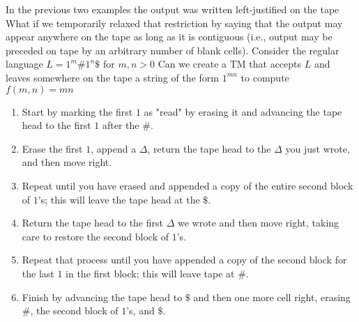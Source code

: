 \documentclass{report}
\begin{document}
\begin{itemize}
            \bigbreak \noindent 
            In the previous two examples the output was written left-justified on the tape
            \bigbreak \noindent 
            What if we temporarily relaxed that restriction by saying that the output may appear anywhere on the tape as long as it is contiguous (i.e., output may be preceded on tape by an arbitrary number of blank cells).
            \bigbreak \noindent 
            Consider the regular language $L = 1^{m}\#1^{n}\$$ for $m,n > 0$
            \bigbreak \noindent 
            Can we create a TM that accepts $L$ and leaves somewhere on the tape a string of the form $1^{mn}$ to compute $f(m,n) = mn$
            \begin{enumerate}
                \item Start by marking the first \(1\) as "read" by erasing it and advancing the tape head to the first \(1\) after the \#.
                \item Erase the first \(1\), append a \(\Delta\), return the tape head to the \(\Delta\) you just wrote, and then move right.
                \item Repeat until you have erased and appended a copy of the entire second block of \(1\)'s; this will leave the tape head at the \(\$ \).
                \item Return the tape head to the first \(\Delta\) we wrote and then move right, taking care to restore the second block of \(1\)'s.
                \item Repeat that process until you have appended a copy of the second block for the last \(1\) in the first block; this will leave tape at \#.
                \item Finish by advancing the tape head to \(\$\) and then one more cell right, erasing \#, the second block of \(1\)'s, and \(\$\).
            \end{enumerate}
            \bigbreak \noindent 

    \end{itemize}

    \pagebreak 
\end{document}
